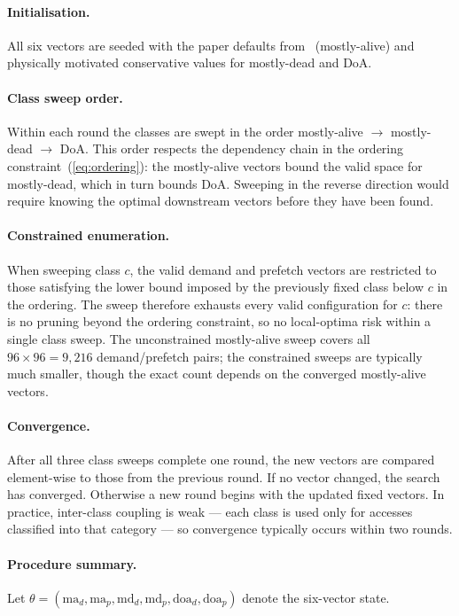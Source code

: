 \documentclass[12pt]{article}
\begin{document}
\paragraph{Initialisation.}  All six vectors are seeded with the paper defaults
from~\cite{mostofi2025pacipv} (mostly-alive) and physically motivated
conservative values for mostly-dead and DoA.

\paragraph{Class sweep order.}  Within each round the classes are swept in the
order mostly-alive $\to$ mostly-dead $\to$ DoA.  This order respects the
dependency chain in the ordering constraint~(\ref{eq:ordering}): the
mostly-alive vectors bound the valid space for mostly-dead, which in turn bounds
DoA.  Sweeping in the reverse direction would require knowing the optimal
downstream vectors before they have been found.

\paragraph{Constrained enumeration.}  When sweeping class $c$, the valid demand
and prefetch vectors are restricted to those satisfying the lower bound imposed
by the previously fixed class below $c$ in the ordering.  The sweep therefore
exhausts every valid configuration for $c$: there is no pruning beyond the
ordering constraint, so no local-optima risk within a single class sweep.  The
unconstrained mostly-alive sweep covers all $96\times96=9{,}216$ demand/prefetch
pairs; the constrained sweeps are typically much smaller, though the exact count
depends on the converged mostly-alive vectors.

\paragraph{Convergence.}  After all three class sweeps complete one round, the
new vectors are compared element-wise to those from the previous round.  If no
vector changed, the search has converged.  Otherwise a new round begins with the
updated fixed vectors.  In practice, inter-class coupling is weak --- each class
is used only for accesses classified into that category --- so convergence
typically occurs within two rounds.

\paragraph{Procedure summary.}  Let $\theta = (\text{ma}_d, \text{ma}_p,
\text{md}_d, \text{md}_p, \text{doa}_d, \text{doa}_p)$ denote the six-vector
state.
\end{document}
